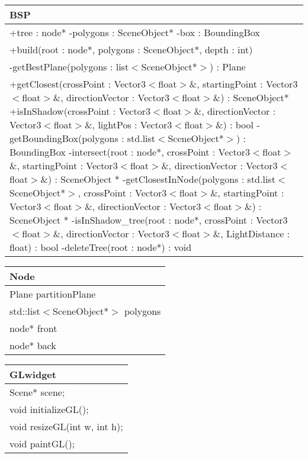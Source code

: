 \begin{center}
    \begin{tabular}{|l|}
    \hline
    BSP \\ \hline
    +tree : node*
    -polygons : SceneObject*
    -box : BoundingBox \\ 
	\hline
	+build(root : node*, polygons : SceneObject*, depth : int) \\ 
	-getBestPlane(polygons : list$<$SceneObject*$>$) : Plane \\
	+getClosest(crossPoint : Vector3$<$float$>$\&, startingPoint : Vector3$<$float$>$\&, directionVector : Vector3$<$float$>$\&) : SceneObject*
	+isInShadow(crossPoint : Vector3$<$float$>$\&, directionVector : Vector3$<$float$>$\&, lightPos : Vector3$<$float$>$\&) : bool
	-getBoundingBox(polygons : std.list$<$SceneObject*$>$) : BoundingBox
	-intersect(root : node*, crossPoint : Vector3$<$float$>$\&, startingPoint : Vector3$<$float$>$\&, directionVector : Vector3$<$float$>$\&) : SceneObject *
	-getClosestInNode(polygons : std.list$<$SceneObject*$>$, crossPoint : Vector3$<$float$>$\&, startingPoint : Vector3$<$float$>$\&, directionVector : Vector3$<$float$>$\&) : SceneObject *
	-isInShadow\_tree(root : node*, crossPoint : Vector3$<$float$>$\&, directionVector : Vector3$<$float$>$\&, LightDistance : float) : bool
	-deleteTree(root : node*) : void
	\hline
    \end{tabular}
\end{center}

\begin{center}
    \begin{tabular}{|l|}
    \hline
    Node \\ \hline
    Plane partitionPlane \\
    std::list$<$SceneObject*$>$ polygons \\
    node* front \\
    node* back \\ \hline
    \end{tabular}
\end{center}


\begin{center}
    \begin{tabular}{|l|}
    \hline
    GLwidget \\ \hline
    Scene* scene; \\ \hline
    void initializeGL(); \\ 
    void resizeGL(int w, int h); \\
    void paintGL(); \\ \hline
    \end{tabular}
\end{center}


